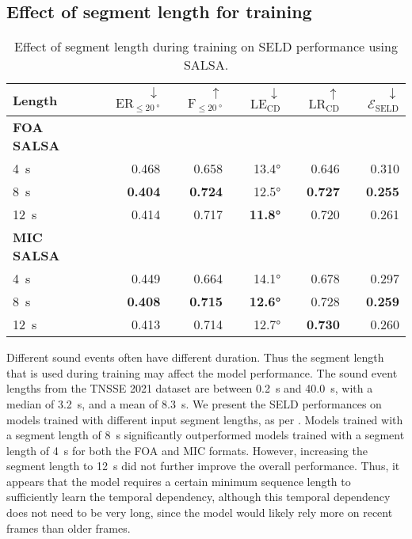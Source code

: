 \documentclass[journal]{IEEEtran}
\begin{document}
\subsection{Effect of segment length for training}

\begin{table}[t]
    \setlength{\tabcolsep}{3pt}
    \centering
    \caption{Effect of segment length during training on SELD performance using SALSA.}
    \noindent\begin{tabularx}{\columnwidth}{Xrrrrr}
    \toprule 
        Length &
        $\downarrow$ $\text{ER}_{\le \SI{20}{\degree}}$ &
        $\uparrow$ $\text{F}_{\le \SI{20}{\degree}}$ &
        $\downarrow$ $\text{LE}_\text{CD}$&
        $\uparrow$ $\text{LR}_\text{CD}$ &
        $\downarrow$ $\mathcal{E}_\text{SELD}$
        \\ \midrule
        \bfseries FOA SALSA\\
        
        \SI{4}{\second}      & 0.468 & 0.658 & 13.4\si{\degree} & 0.646 & 0.310 
                \\
        \SI{8}{\second}       & \bf{0.404} & \bf{0.724} & 12.5\si{\degree} & \bf{0.727} & \bf{0.255}
               \\
        \SI{12}{\second}      & 0.414 & 0.717 & \bf{11.8\si{\degree}} & 0.720 & 0.261
               \\ 
        \midrule
        \bfseries MIC SALSA\\
        
        \SI{4}{\second}      
                & 0.449 & 0.664 & 14.1\si{\degree} & 0.678 & 0.297 \\
        \SI{8}{\second}     
                & \bf{0.408} & \bf{0.715} & \bf{12.6\si{\degree}} & 0.728 & \bf{0.259} \\
        \SI{12}{\second}    & 0.413 & 0.714 & 12.7\si{\degree} & \bf{0.730} & 0.260 \\ 
    \bottomrule
    \end{tabularx}
    \label{tab:segment_length}
\end{table}

Different sound events often have different duration. Thus the segment length that is used during training may affect the model performance. The sound event lengths from the TNSSE 2021 dataset are between \SI{0.2}{\second} and \SI{40.0}{\second}, with a median of \SI{3.2}{\second}, and a mean of \SI{8.3}{\second}. We present the SELD performances on models trained with different input segment lengths, as per . Models trained with a segment length of \SI{8}{\second} significantly outperformed models trained with a segment length of \SI{4}{\second} for both the FOA and MIC formats. However, increasing the segment length to \SI{12}{\second} did not further improve the overall performance. Thus, it appears that the model requires a certain minimum sequence length to sufficiently learn the temporal dependency, although this temporal dependency does not need to be very long, since the model would likely rely more on recent frames than older frames.  
\end{document}
